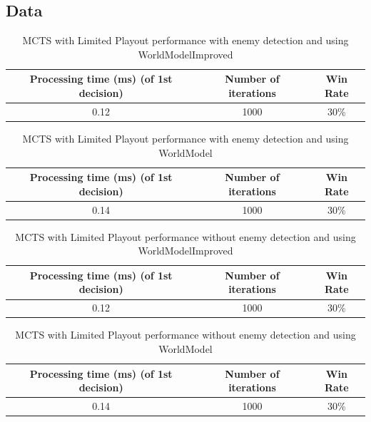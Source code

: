 \documentclass{article}
\begin{document}
  \subsection{Data}
  \begin{table}[h!]
    \centering
    \caption{MCTS with Limited Playout performance with enemy detection and using WorldModelImproved}
    \label{tab:tableLimitedMCTS1}
    \begin{tabular}{c|c|c}
      \textbf{Processing time (ms) (of 1st decision)} & \textbf{Number of iterations} & \textbf{Win Rate}\\
      \hline
      0.12 & 1000 & 30\%
    \end{tabular}
  \end{table}
  \begin{table}[h!]
    \centering
    \caption{MCTS with Limited Playout performance with enemy detection and using WorldModel}
    \label{tab:tableLimitedMCTS2}
    \begin{tabular}{c|c|c}
      \textbf{Processing time (ms) (of 1st decision)} & \textbf{Number of iterations} & \textbf{Win Rate}\\
      \hline
      0.14 & 1000 & 30\%
    \end{tabular}
  \end{table}
  \begin{table}[h!]
    \centering
    \caption{MCTS with Limited Playout performance without enemy detection and using WorldModelImproved}
    \label{tab:tableLimitedMCTS3}
    \begin{tabular}{c|c|c}
      \textbf{Processing time (ms) (of 1st decision)} & \textbf{Number of iterations} & \textbf{Win Rate}\\
      \hline
      0.12 & 1000 & 30\%
    \end{tabular}
  \end{table}
  \begin{table}[h!]
    \centering
    \caption{MCTS with Limited Playout performance without enemy detection and using WorldModel}
    \label{tab:tableLimitedMCTS4}
    \begin{tabular}{c|c|c}
      \textbf{Processing time (ms) (of 1st decision)} & \textbf{Number of iterations} & \textbf{Win Rate}\\
      \hline
      0.14 & 1000 & 30\%
    \end{tabular}
  \end{table}
\end{document}

